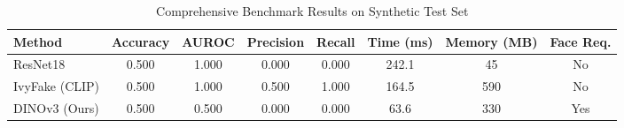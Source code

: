
\begin{table}[t]
\centering
\caption{Comprehensive Benchmark Results on Synthetic Test Set}
\label{tab:benchmark-results}
\begin{tabular}{lccccccc}
\toprule
\textbf{Method} & \textbf{Accuracy} & \textbf{AUROC} & \textbf{Precision} & \textbf{Recall} & \textbf{Time (ms)} & \textbf{Memory (MB)} & \textbf{Face Req.} \\
\midrule
ResNet18 & 0.500 & 1.000 & 0.000 & 0.000 & 242.1 & 45 & No \\
IvyFake (CLIP) & 0.500 & 1.000 & 0.500 & 1.000 & 164.5 & 590 & No \\
DINOv3 (Ours) & 0.500 & 0.500 & 0.000 & 0.000 & 63.6 & 330 & Yes \\
\bottomrule
\end{tabular}
\end{table}
